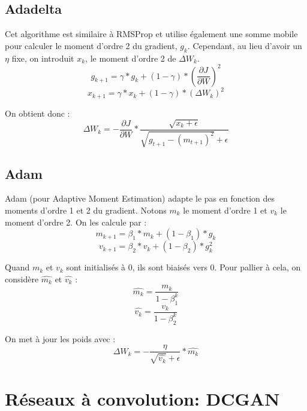 \subsection{Adadelta}
Cet algorithme est similaire à RMSProp et utilise également une somme mobile pour calculer le moment d'ordre 2 du gradient, $g_k$. Cependant, au lieu d'avoir un $\eta$ fixe, on introduit $x_k$, le moment d'ordre 2 de $\Delta W_k$.
\[g_{k+1} = \gamma*g_k + (1-\gamma)*(\frac{\partial J}{\partial W})^2\]
\[x_{k+1} = \gamma*x_k + (1-\gamma)*(\Delta W_k)^2\]

On obtient donc :
\[\Delta W_k = -\frac{\partial J}{\partial W}*\frac{\sqrt{x_k + \epsilon}}{\sqrt{g_{t+1}-(m_{t+1})^2}+\epsilon}\]
\subsection{Adam}
Adam (pour Adaptive Moment Estimation) adapte le pas en fonction des moments d'ordre 1 et 2 du gradient. Notons $m_k$ le moment d'ordre 1 et $v_k$ le moment d'ordre 2.
On les calcule par :
\[m_{k+1} = \beta_1*m_k + (1-\beta_1)*g_k\]
\[v_{k+1} = \beta_2*v_k + (1-\beta_2)*g_k^2\]

Quand $m_k$ et $v_k$ sont initialisés à 0, ils sont biaisés vers 0.
Pour pallier à cela, on considère $\widehat{m_k}$ et $\widehat{v_k}$ : 
\[\widehat{m_{k}} = \frac{m_k}{1-\beta_1^k}\]
\[\widehat{v_{k}} = \frac{v_k}{1-\beta_2^k}\]

On met à jour les poids avec :
\[\Delta W_k = -\frac{\eta}{\sqrt{\widehat{v_k}}+\epsilon}*\widehat{m_k}\]

\section{Réseaux à convolution: DCGAN}

